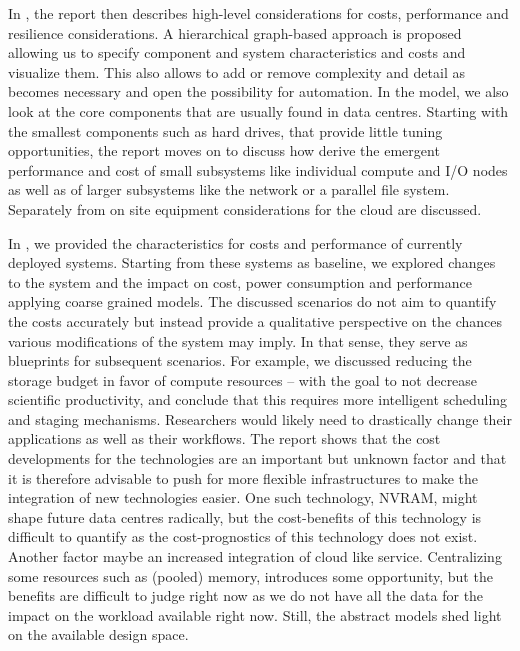 \documentclass{../../template/esiwace-report}
\begin{document}
%
%
%
%
%
%
%
%
%
%



%

In , the report then describes high-level considerations for costs, performance and resilience considerations.
A hierarchical graph-based approach is proposed allowing us to specify component and system characteristics and costs and visualize them.
This also allows to add or remove complexity and detail as becomes necessary and open the possibility for automation.
In the model, we also look at the core components that are usually found in data centres.
Starting with the smallest components such as hard drives, that provide little tuning opportunities, the report moves on to discuss how derive the emergent performance and cost of small subsystems like individual compute and I/O nodes as well as of  larger subsystems like the network or a parallel file system.
Separately from on site equipment considerations for the cloud are discussed.


%
%
%
%


%

In , we provided the characteristics for costs and performance of currently deployed systems.
Starting from these systems as baseline, we explored changes to the system and the impact on cost, power consumption and performance applying coarse grained models.
The discussed scenarios do not aim to quantify the costs accurately but instead provide a qualitative perspective on the chances various modifications of the system may imply.
In that sense, they serve as blueprints for subsequent scenarios.
For example, we discussed reducing the storage budget in favor of compute resources -- with the goal to not decrease scientific productivity, and conclude that this requires more intelligent scheduling and staging mechanisms.
Researchers would likely need to drastically change their applications as well as their workflows.
The report shows that the cost developments for the technologies are an important but unknown factor and that it is therefore advisable to push for more flexible infrastructures to make the integration of new technologies easier.
One such technology, NVRAM, might shape future data centres radically, but the cost-benefits of this technology is difficult to quantify as the cost-prognostics of this technology does not exist.
Another factor maybe an increased integration of cloud like service.
Centralizing some resources such as (pooled) memory, introduces some opportunity, but the benefits are difficult to judge right now as we do not have all the data for the impact on the workload available right now.
Still, the abstract models shed light on the available design space.
\end{document}
